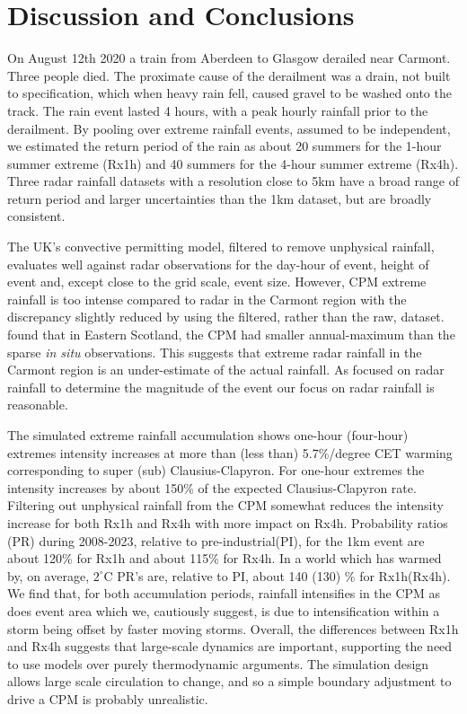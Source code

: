 \documentclass[11pt,a4paper]{article}
\begin{document}
\section{Discussion and Conclusions}
On August 12th 2020 a train from Aberdeen to Glasgow derailed near Carmont. Three people died. The proximate cause of the derailment was a drain, not built to specification, which when heavy rain fell, caused gravel  to be washed onto the track\parencite{carmontReport2024}. The rain event lasted 4 hours, with a peak hourly rainfall prior to the derailment. By pooling over extreme rainfall events, assumed to be independent, we  estimated the return period of the rain  as about 20 summers for the 1-hour summer extreme (Rx1h) and  40 summers for the 4-hour summer extreme (Rx4h). Three radar rainfall datasets with a resolution close to  5km have a broad range of return period and larger uncertainties than the 1km dataset, but are broadly consistent. 

The UK's convective permitting model\parencite{kendon2023uk_cpm}, filtered to remove unphysical rainfall, evaluates  well against radar observations for the day-hour of  event, height of event and, except close to the grid scale, event size. However, CPM extreme rainfall is too intense compared to radar in the Carmont region with the discrepancy slightly reduced by using the filtered, rather than the raw,  dataset.  \cite{kendon2023uk_cpm} found that in Eastern Scotland, the CPM had smaller annual-maximum than the sparse \textit{in situ} observations. This suggests that extreme radar rainfall  in the Carmont region is an under-estimate of the actual rainfall.  As \cite{carmontReport2024} focused on radar rainfall  to determine the magnitude of the event our focus on radar rainfall is reasonable. 

The simulated extreme rainfall accumulation shows one-hour (four-hour) extremes intensity increases at more than (less than) 5.7\%/degree CET warming corresponding to  super (sub) Clausius-Clapyron. For one-hour extremes the intensity increases by  about 150\% of the expected Clausius-Clapyron rate. Filtering out unphysical rainfall from the CPM somewhat reduces the intensity increase for both Rx1h and Rx4h with more impact on Rx4h.  Probability ratios (PR) during 2008-2023, relative to pre-industrial(PI), for the 1km event are about 120\% for Rx1h and about 115\%  for Rx4h.  In a world which has warmed by, on average, $2^\circ$C PR's are, relative to PI, about 140 (130) \% for Rx1h(Rx4h). We find that, for both accumulation periods, rainfall intensifies in the CPM as does event area which we, cautiously suggest, is due to intensification within a storm being offset by faster moving storms.   Overall, the differences between Rx1h and Rx4h  suggests that large-scale dynamics are important, supporting the need to use models over purely thermodynamic arguments. The simulation design allows large scale circulation to change, and so a simple boundary adjustment to drive a CPM is probably unrealistic.  
 
\end{document}
